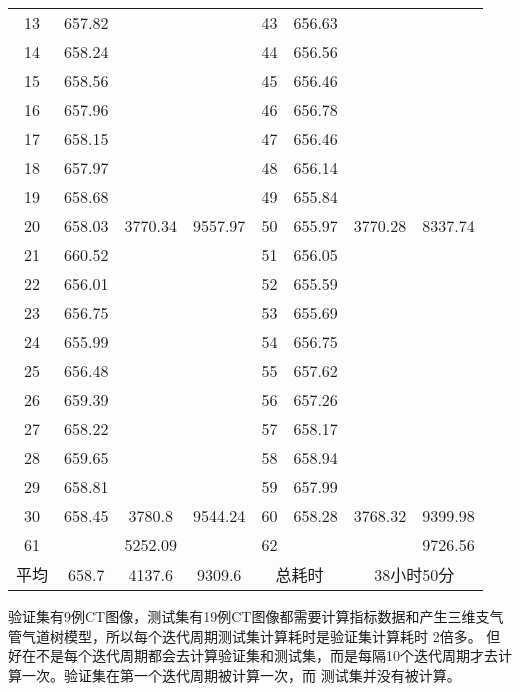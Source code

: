 \begin{table}[ht]
{\begin{tabular}{c|c|c|c||c|c|c|c}
        13	& 657.82	&           &          &   43	& 656.63	&           &         \\             	
        14	& 658.24	&           &          &   44	& 656.56	&           &         \\             	
        15	& 658.56	&           &          &   45	& 656.46	&           &         \\             	
        16	& 657.96	&           &          &   46	& 656.78	&           &         \\             	
        17	& 658.15	&           &          &   47	& 656.46	&           &         \\             	
        18	& 657.97	&           &          &   48	& 656.14	&           &         \\             	
        19	& 658.68	&           &          &   49	& 655.84	&           &         \\             	
        20	& 658.03	& 3770.34	& 9557.97  &   50	& 655.97	& 3770.28	& 8337.74 \\ 
        \hline
        21	& 660.52	&           &          &   51	& 656.05	&           &         \\  	
        22	& 656.01	&           &          &   52	& 655.59	&           &         \\  	
        23	& 656.75	&           &          &   53	& 655.69	&           &         \\  	
        24	& 655.99	&           &          &   54	& 656.75	&           &         \\  	
        25	& 656.48	&           &          &   55	& 657.62	&           &         \\  	
        26	& 659.39	&           &          &   56	& 657.26	&           &         \\  	
        27	& 658.22	&           &          &   57	& 658.17	&           &         \\  	
        28	& 659.65	&           &          &   58	& 658.94	&           &         \\  	
        29	& 658.81	&           &          &   59	& 657.99	&           &         \\  	
        30	& 658.45	& 3780.8	& 9544.24  &   60	& 658.28	& 3768.32	& 9399.98 \\ 	 	 	 	 	 	 	  	 	 	 	 	 	 	 	 	 	 	 	 	 	 	 	 	 	 	
        \hline
        61	&	        & 5252.09	&          &   62   &           &           & 9726.56 \\
        \hline
        \hline
        平均 & 658.7     & 4137.6    & 9309.6   & \multicolumn{2}{|c|}{总耗时} & \multicolumn{2}{|c}{38小时50分} \\
        \hline
    \end{tabular}
    }
\end{table}
验证集有9例CT图像，测试集有19例CT图像都需要计算指标数据和产生三维支气管气道树模型，所以每个迭代周期测试集计算耗时是验证集计算耗时
2倍多。 但好在不是每个迭代周期都会去计算验证集和测试集，而是每隔10个迭代周期才去计算一次。验证集在第一个迭代周期被计算一次，而
测试集并没有被计算。

